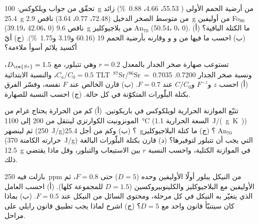 \begin{exercise}[$\star\star$]\label{exo:b2:magmatic-differentiation:9}
تحقّق من جواب ويلكوكس: \qty{100}{g} من أرضية الحمم الأولى (
55.53،  4.66،  \qty{0.88}{\percent}) زائد \qty{25.4}{g} من متوسط
الصخر الدخيل (72.48، 0.77، 3.64) ناقص \qty{2.9}{g} من أوليفين Fo$_{80}$ (39.19، 42.06، 0)
ناقص \qty{9.6}{g} من بلاجيوكليز An$_{70}$ (50.54، 0، 0). (أ) ما الكتلة الباقية؟
(ب) احسب ما فيها من  و و وقارنه بأرضية
الحمم 19 (60.16 و3.19 و\qty{1.75}{\percent}). (ج) أيّ أكسيد يلائم أسوأ ملاءمة؟
\end{exercise}

\begin{exercise}[$\star\star\star$]\label{exo:b2:magmatic-differentiation:10}
تستوعب صهارة صخر الجدار بالمعدل $r = 0.2$ وهي تتبلور، مع $D_{\ce{Sr}} =
1.5$، $C_a/C_0 = 0.5$، والنسبة الابتدائية \mbox{\textdir TLT $^{87}$Sr/$^{86}$Sr = 0.7035} ونسبة صخر الجدار 0.7200.
(أ) احسب $z$ و$F^{-z}$ و$C/C_0$ عند $F = 0.7$. (ب) قارن 
الخالص عند $F$ نفسه، وفسّر الفرق بكتلة البلّورات
المتكوّنة في كل حالة. (ج) احسب النسبة  للصهارة.
\end{exercise}

\begin{exercise}[$\star\star\star$]\label{exo:b2:magmatic-differentiation:11}
تتبّع الموازنة الحرارية لويلكوكس في باريكوتين. (أ) كم من الحرارة يحتاج غرام من
المونزونيت الكوارتزي لينتقل من 200 إلى \qty{1100}{\celsius} (السعة الحرارية
\qty{1.1}{J/(g.K)}) ثم لينصهر (\qty{250}{J/g})؟ (ب) وكم من أجل
\qty{25.4}{g}؟ (ج) ما كتلة البلاجيوكليز An$_{70}$ (حرارته الكامنة \qty{370}{J/g})
التي يجب أن تتبلور لتوفيرها؟ (د) قارن بكتلة البلّورات البالغة \qty{12.5}{g} في
الموازنة الكتلية، واحسب النسبة $r$ بين الاستيعاب والتبلور، وقل ماذا
يقتضي ذلك.
\end{exercise}

\begin{exercise}[$\star\star\star$]\label{exo:b2:magmatic-differentiation:12}
بازلت فيه \qty{250}{ppm} من النيكل يبلور أولًا الأوليفين وحده ($D = 5$) حتى
$F = 0.8$، ثم الأوليفين مع البلاجيوكليز والكلينوبيروكسين ($D = 1.5$ للمجموعة كلها). (أ)
احسب العامل الذي يتغيّر به النيكل في كل مرحلة، ومحتوى السائل من النيكل
عند $F = 0.5$. (ب) بماذا كان سيتنبّأ قانون واحد مع $D = 5$؟
(ج) اشرح لماذا يجب تطبيق قانون رايلي على مراحل.
\end{exercise}

